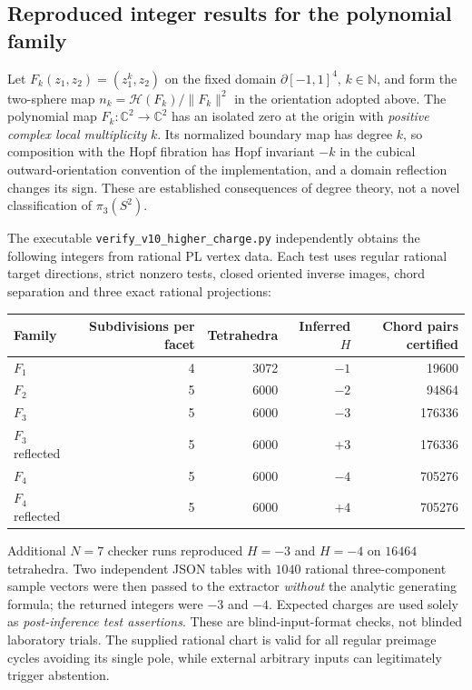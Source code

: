 \documentclass[aps,prd,onecolumn,notitlepage,11pt,superscriptaddress,longbibliography]{revtex4-2}
\begin{document}
\subsection{Reproduced integer results for the polynomial family}
Let $F_k(z_1,z_2)=(z_1^k,z_2)$ on the fixed domain $\partial[-1,1]^4$, $k\in\mathbb N$, and form the two-sphere map $n_k=\mathcal H(F_k)/\|F_k\|^2$ in the orientation adopted above. The polynomial map $F_k:\mathbb C^2\to\mathbb C^2$ has an isolated zero at the origin with \emph{positive complex local multiplicity} $k$. Its normalized boundary map has degree $k$, so composition with the Hopf fibration has Hopf invariant $-k$ in the cubical outward-orientation convention of the implementation, and a domain reflection changes its sign. These are established consequences of degree theory, not a novel classification of $\pi_3(S^2)$.

The executable \texttt{verify\_v10\_higher\_charge.py} independently obtains the following integers from rational PL vertex data. Each test uses regular rational target directions, strict nonzero tests, closed oriented inverse images, chord separation and three exact rational projections:
\begin{center}
\begin{tabular}{lrrrr}
\toprule
Family & Subdivisions per facet & Tetrahedra & Inferred $H$ & Chord pairs certified\\
\midrule
$F_1$ & 4 & 3072 & $-1$ & 19600\\
$F_2$ & 5 & 6000 & $-2$ & 94864\\
$F_3$ & 5 & 6000 & $-3$ & 176336\\
$F_3$ reflected & 5 & 6000 & $+3$ & 176336\\
$F_4$ & 5 & 6000 & $-4$ & 705276\\
$F_4$ reflected & 5 & 6000 & $+4$ & 705276\\
\bottomrule
\end{tabular}
\end{center}
Additional $N=7$ checker runs reproduced $H=-3$ and $H=-4$ on $16464$ tetrahedra. Two independent JSON tables with $1040$ rational three-component sample vectors were then passed to the extractor \emph{without} the analytic generating formula; the returned integers were $-3$ and $-4$. Expected charges are used solely as \emph{post-inference test assertions}. These are blind-input-format checks, not blinded laboratory trials. The supplied rational chart is valid for all regular preimage cycles avoiding its single pole, while external arbitrary inputs can legitimately trigger abstention.
\end{document}

